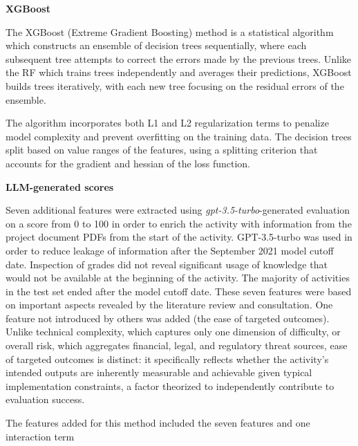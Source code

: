 \textbf{XGBoost}

The XGBoost (Extreme Gradient Boosting) method is a statistical algorithm which constructs an ensemble of decision trees sequentially, where each subsequent tree attempts to correct the errors made by the previous trees. Unlike the RF which trains trees independently and averages their predictions, XGBoost builds trees iteratively, with each new tree focusing on the residual errors of the ensemble. 

The algorithm incorporates both L1 and L2 regularization terms to penalize model complexity and prevent overfitting on the training data. The decision trees split based on value ranges of the features, using a splitting criterion that accounts for the gradient and hessian of the loss function.

\textbf{LLM-generated scores}

Seven additional features were extracted using \emph{gpt-3.5-turbo}-generated evaluation on a score from 0 to 100 in order to enrich the activity with information from the project document PDFs from the start of the activity. GPT-3.5-turbo was used in order to reduce leakage of information after the September 2021 model cutoff date. Inspection of grades did not reveal significant usage of knowledge that would not be available at the beginning of the activity. The majority of activities in the test set ended after the model cutoff date. These seven features were based on important aspects revealed by the literature review and consultation. One feature not introduced by others was added (the ease of targeted outcomes). Unlike technical complexity, which captures only one dimension of difficulty, or overall risk, which aggregates financial, legal, and regulatory threat sources, ease of targeted outcomes is distinct: it specifically reflects whether the activity's intended outputs are inherently measurable and achievable given typical implementation constraints, a factor theorized to independently contribute to evaluation success.

The features added for this method included the seven features and one interaction term

